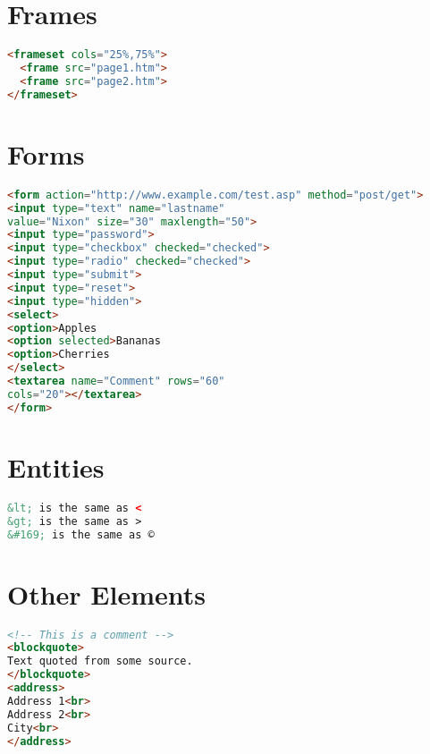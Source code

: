 \section{Frames}

\begin{lstlisting}[language=HTML]
<frameset cols="25%,75%">
  <frame src="page1.htm">
  <frame src="page2.htm">
</frameset>
\end{lstlisting}


\section{Forms}


\begin{lstlisting}[language=HTML]
<form action="http://www.example.com/test.asp" method="post/get">
<input type="text" name="lastname"
value="Nixon" size="30" maxlength="50">
<input type="password">
<input type="checkbox" checked="checked">
<input type="radio" checked="checked">
<input type="submit">
<input type="reset">
<input type="hidden">
<select>
<option>Apples
<option selected>Bananas
<option>Cherries
</select>
<textarea name="Comment" rows="60"
cols="20"></textarea>
</form>
\end{lstlisting}

\section{Entities}

\begin{lstlisting}[language=HTML]
&lt; is the same as <
&gt; is the same as >
&#169; is the same as ©
\end{lstlisting}

\section{Other Elements}


\begin{lstlisting}[language=HTML]
<!-- This is a comment -->
<blockquote>
Text quoted from some source.
</blockquote>
<address>
Address 1<br>
Address 2<br>
City<br>
</address>
\end{lstlisting}
























